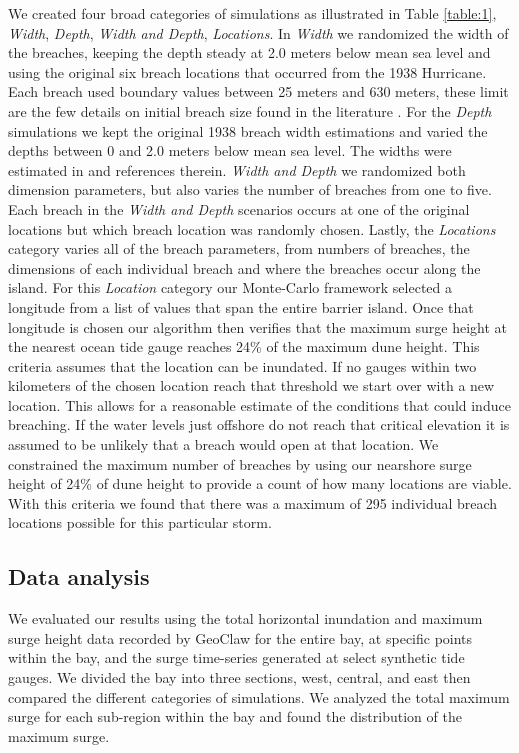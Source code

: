 \documentclass{coastal_paper}
\begin{document}
We created four broad categories of simulations as illustrated in Table \ref{table:1}, \emph{Width}, \emph{Depth}, \emph{Width and Depth}, \emph{Locations}. In \emph{Width} we randomized the width of the breaches, keeping the depth steady at 2.0 meters below mean sea level and using the original six breach locations that occurred from the 1938 Hurricane. Each breach used boundary values between 25 meters and 630 meters, these limit are the few details on initial breach size found in the literature \citep{Schmeltz1983Breach/InletInlet., Kraus2003a,Visser1999, Canizares2008}. For the \emph{Depth} simulations we kept the original 1938 breach width estimations and varied the depths between 0 and 2.0 meters below mean sea level. The widths were estimated in \citet{Canizares2008} and references therein. \emph{Width and Depth} we randomized both dimension parameters, but also varies the number of breaches from one to five. Each breach in the \emph{Width and Depth} scenarios occurs at one of the original locations but which breach location was randomly chosen. Lastly, the \emph{Locations} category varies all of the breach parameters, from numbers of breaches, the dimensions of each individual breach and where the breaches occur along the island.
For this \emph{Location} category our Monte-Carlo framework selected a longitude from a list of values that span the entire barrier island. Once that longitude is chosen our algorithm then verifies that the maximum surge height at the nearest ocean tide gauge reaches 24\% of the maximum dune height. This criteria assumes that the location can be inundated. If no gauges within two kilometers of the chosen location reach that threshold we start over with a new location. This allows for a reasonable estimate of the conditions that could induce breaching. If the water levels just offshore do not reach that critical elevation it is assumed to be unlikely that a breach would open at that location. We constrained the maximum number of breaches by using our nearshore surge height of 24\% of dune height to provide a count of how many locations are viable. With this criteria we found that there was a maximum of 295 individual breach locations possible for this particular storm.

\subsection{Data analysis}
We evaluated our results using the total horizontal inundation and maximum surge height data recorded by GeoClaw for the entire bay, at specific points within the bay, and the surge time-series generated at select synthetic tide gauges. We divided the bay into three sections, west, central, and east then compared the different categories of simulations. We analyzed the total maximum surge for each sub-region within the bay and found the distribution of the maximum surge.
\end{document}
